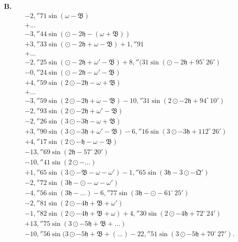 \documentclass[12pt,a4paper]{article}
\newcommand{\Ceres}{\odot}
\newcommand{\Jupiter}{\mathfrak{h}}
\begin{document}
\newpage
\setcounter{page}{419}
%
\noindent\textbf{B.}
\begin{align*}
&-2{,}''71 \sin(\omega - \mathfrak{B})\\
&+\ldots\\
&-3{,}''44 \sin(\Ceres - 2\Jupiter - (\omega + \mathfrak{B}))\\
&+3{,}''33 \sin(\Ceres - 2\Jupiter + \omega - \mathfrak{B}) + 1{,}''91\\
&+\ldots\\
&-2{,}''25 \sin(\Ceres - 2\Jupiter + \omega' - \mathfrak{B}) + 8{,}''(31 \sin(\Ceres - 2\Jupiter + 95^\circ\,26')\\
&-0{,}''24 \sin(\Ceres - 2\Jupiter - \omega' - \mathfrak{B})\\
&+4{,}''59 \sin(2\Ceres - 2\Jupiter - \omega + \mathfrak{B})\\
&+\ldots\\
&-3{,}''59 \sin(2\Ceres - 2\Jupiter + \omega - \mathfrak{B}) - 10{,}''31 \sin(2\Ceres - 2\Jupiter + 94^\circ\,10')\\
&-2{,}''93 \sin(2\Ceres - 2\Jupiter + \omega' - \mathfrak{B})\\
&-2{,}''26 \sin(3\Ceres - 3\Jupiter - \omega + \mathfrak{B})\\
&+3{,}''90 \sin(3\Ceres - 3\Jupiter + \omega' - \mathfrak{B}) - 6{,}''16 \sin(3\Ceres - 3\Jupiter + 112^\circ\,26')\\
&+4{,}''17 \sin(2\Ceres - \Jupiter - \omega - \mathfrak{B})\\
&-13{,}''69 \sin(2\Jupiter - 57^\circ\,20')\\
&-10{,}''41 \sin(2\Ceres - \ldots)\\
&+1{,}''65 \sin(3\Ceres - \mathfrak{B} - \omega - \omega') - 1{,}''65 \sin(3\Jupiter - 3\Ceres - \mathfrak{Q}')\\
&-2{,}''72 \sin(3\Jupiter - \Ceres - \omega - \omega')\\
&-4{,}''56 \sin(3\Jupiter - \ldots) - 6{,}''77 \sin(3\Jupiter - \Ceres - 61^\circ\,25')\\
&-2{,}''81 \sin(2\Ceres - 4\Jupiter + \mathfrak{B} + \omega')\\
&-1{,}''82 \sin(2\Ceres - 4\Jupiter + \mathfrak{B} + \omega) + 4{,}''30 \sin(2\Ceres - 4\Jupiter + 72^\circ\,24')\\
&+13{,}''75 \sin(3\Ceres - 5\Jupiter + \mathfrak{B} + \ldots)\\
&-10{,}''56 \sin(3\Ceres - 5\Jupiter + \mathfrak{B} + (\ldots) - 22{,}''51 \sin(3\Ceres - 5\Jupiter + 70^\circ\,27').
\end{align*}
\end{document}
